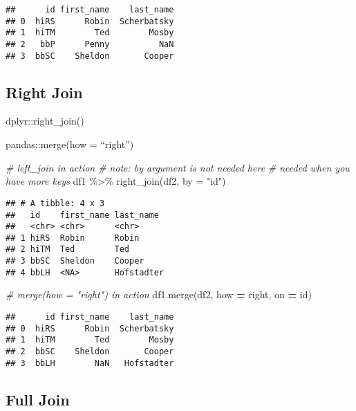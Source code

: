 \documentclass[
]{book}
\newenvironment{Shaded}{\begin{snugshade}}{\end{snugshade}}
\newcommand{\AttributeTok}[1]{\textcolor[rgb]{0.77,0.63,0.00}{#1}}
\newcommand{\CommentTok}[1]{\textcolor[rgb]{0.56,0.35,0.01}{\textit{#1}}}
\newcommand{\FunctionTok}[1]{\textcolor[rgb]{0.00,0.00,0.00}{#1}}
\newcommand{\NormalTok}[1]{#1}
\newcommand{\OperatorTok}[1]{\textcolor[rgb]{0.81,0.36,0.00}{\textbf{#1}}}
\newcommand{\SpecialCharTok}[1]{\textcolor[rgb]{0.00,0.00,0.00}{#1}}
\newcommand{\StringTok}[1]{\textcolor[rgb]{0.31,0.60,0.02}{#1}}
\begin{document}
\begin{verbatim}
##      id first_name    last_name
## 0  hiRS      Robin  Scherbatsky
## 1  hiTM        Ted        Mosby
## 2   bbP      Penny          NaN
## 3  bbSC    Sheldon       Cooper
\end{verbatim}

\hypertarget{right-join}{%
\subsection{Right Join}\label{right-join}}

dplyr::right\_join()

pandas::merge(how = ``right'')

\begin{Shaded}
\begin{Highlighting}[]
\CommentTok{\# left\_join in action}
\CommentTok{\# note: by argument is not needed here}
\CommentTok{\# needed when you have more keys}
\NormalTok{df1 }\SpecialCharTok{\%\textgreater{}\%} \FunctionTok{right\_join}\NormalTok{(df2, }\AttributeTok{by =} \StringTok{"id"}\NormalTok{)}
\end{Highlighting}
\end{Shaded}

\begin{verbatim}
## # A tibble: 4 x 3
##   id    first_name last_name 
##   <chr> <chr>      <chr>     
## 1 hiRS  Robin      Robin     
## 2 hiTM  Ted        Ted       
## 3 bbSC  Sheldon    Cooper    
## 4 bbLH  <NA>       Hofstadter
\end{verbatim}

\begin{Shaded}
\begin{Highlighting}[]
\CommentTok{\# merge(how = "right") in action}
\NormalTok{df1.merge(df2, how }\OperatorTok{=} \StringTok{\textquotesingle{}right\textquotesingle{}}\NormalTok{, on }\OperatorTok{=} \StringTok{\textquotesingle{}id\textquotesingle{}}\NormalTok{)}
\end{Highlighting}
\end{Shaded}

\begin{verbatim}
##      id first_name    last_name
## 0  hiRS      Robin  Scherbatsky
## 1  hiTM        Ted        Mosby
## 2  bbSC    Sheldon       Cooper
## 3  bbLH        NaN   Hofstadter
\end{verbatim}

\hypertarget{full-join}{%
\subsection{Full Join}\label{full-join}}
\end{document}
